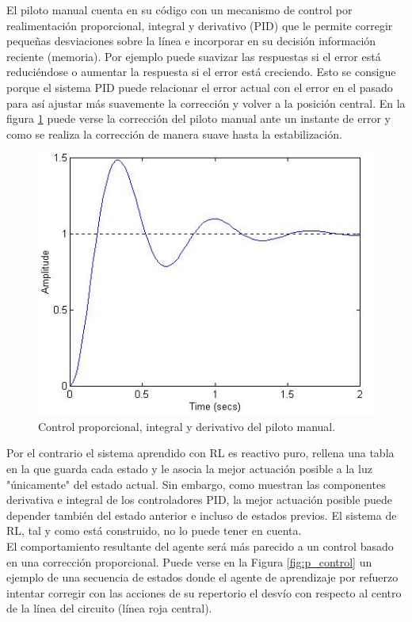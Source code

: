 El piloto manual cuenta en su código con un mecanismo de control por realimentación proporcional, integral y derivativo (PID) que le permite corregir pequeñas desviaciones sobre la línea e incorporar en su decisión información reciente (memoria). Por ejemplo puede suavizar las respuestas si el error está reduciéndose o aumentar la respuesta si el error está creciendo. Esto se consigue porque el sistema PID puede relacionar el error actual con el error en el pasado para así ajustar más suavemente la corrección y volver a la posición central. En la figura \ref{fig:pid_control} puede verse la corrección del piloto manual ante un instante de error y como se realiza la corrección de manera suave hasta la estabilización.\\

\begin{figure}[ht!]
    \centering \includegraphics[width=0.5\columnwidth]{./figures/chapter_5/pid_control.jpg}
    \caption{Control proporcional, integral y derivativo del piloto manual.}\label{fig:pid_control}
\end{figure}

Por el contrario el sistema aprendido con RL es reactivo puro, rellena una tabla en la que guarda cada estado y le asocia la mejor actuación posible a la luz "únicamente" del estado actual. Sin embargo, como muestran las componentes derivativa e integral de los controladores PID, la mejor actuación posible puede depender también del estado anterior e incluso de estados previos. El sistema de RL, tal y como está construido, no lo puede tener en cuenta.\\

El comportamiento resultante del agente será más parecido a un control basado en una corrección proporcional. Puede verse en la Figura \ref{fig:p_control} un ejemplo de una secuencia de estados donde el agente de aprendizaje por refuerzo intentar corregir con las acciones de su repertorio el desvío con respecto al centro de la línea del circuito (línea roja central).\\

